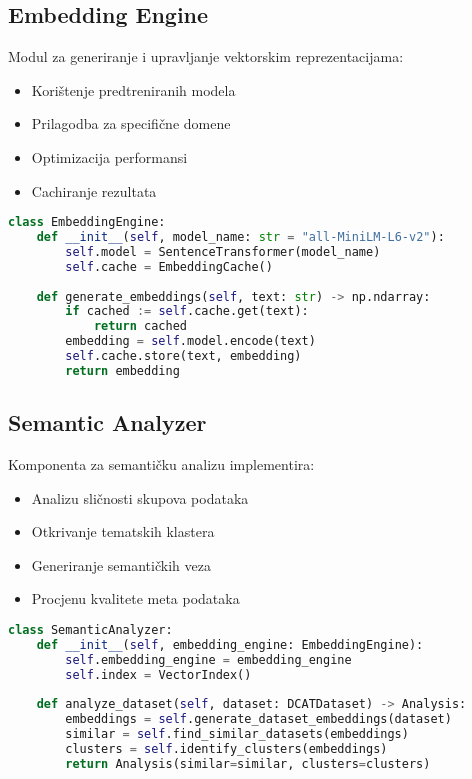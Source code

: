 \subsection{Embedding Engine}
Modul za generiranje i upravljanje vektorskim reprezentacijama:
\begin{itemize}
    \item Korištenje predtreniranih modela
    \item Prilagodba za specifične domene
    \item Optimizacija performansi
    \item Cachiranje rezultata
\end{itemize}

\begin{lstlisting}[language=Python, caption=Implementacija Embedding Engine-a]
class EmbeddingEngine:
    def __init__(self, model_name: str = "all-MiniLM-L6-v2"):
        self.model = SentenceTransformer(model_name)
        self.cache = EmbeddingCache()
    
    def generate_embeddings(self, text: str) -> np.ndarray:
        if cached := self.cache.get(text):
            return cached
        embedding = self.model.encode(text)
        self.cache.store(text, embedding)
        return embedding
\end{lstlisting}

\subsection{Semantic Analyzer}
Komponenta za semantičku analizu implementira:
\begin{itemize}
    \item Analizu sličnosti skupova podataka
    \item Otkrivanje tematskih klastera
    \item Generiranje semantičkih veza
    \item Procjenu kvalitete meta podataka
\end{itemize}

\begin{lstlisting}[language=Python, caption=Implementacija Semantic Analyzer-a]
class SemanticAnalyzer:
    def __init__(self, embedding_engine: EmbeddingEngine):
        self.embedding_engine = embedding_engine
        self.index = VectorIndex()
    
    def analyze_dataset(self, dataset: DCATDataset) -> Analysis:
        embeddings = self.generate_dataset_embeddings(dataset)
        similar = self.find_similar_datasets(embeddings)
        clusters = self.identify_clusters(embeddings)
        return Analysis(similar=similar, clusters=clusters)
\end{lstlisting}

